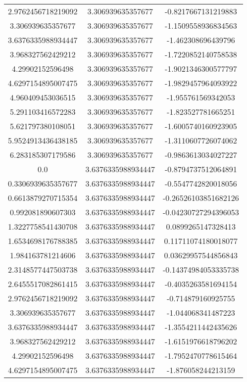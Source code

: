 \begin{table}
\begin{tabular}{ccc}
2.9762456718219092 & 3.306939635357677 & -0.8217667131219883 \\
3.306939635357677 & 3.306939635357677 & -1.1509558936834563 \\
3.6376335988934447 & 3.306939635357677 & -1.462308696439796 \\
3.968327562429212 & 3.306939635357677 & -1.7220852140758538 \\
4.29902152596498 & 3.306939635357677 & -1.9021346300577797 \\
4.6297154895007475 & 3.306939635357677 & -1.9829457964093922 \\
4.960409453036515 & 3.306939635357677 & -1.955761569342053 \\
5.291103416572283 & 3.306939635357677 & -1.823527781665251 \\
5.621797380108051 & 3.306939635357677 & -1.6005740160923905 \\
5.9524913436438185 & 3.306939635357677 & -1.3110607726074062 \\
6.283185307179586 & 3.306939635357677 & -0.9863613034027227 \\
0.0 & 3.6376335988934447 & -0.8794737512064891 \\
0.3306939635357677 & 3.6376335988934447 & -0.5547742820018056 \\
0.6613879270715354 & 3.6376335988934447 & -0.26526103851682126 \\
0.992081890607303 & 3.6376335988934447 & -0.04230727294396053 \\
1.3227758541430708 & 3.6376335988934447 & 0.0899265147328413 \\
1.6534698176788385 & 3.6376335988934447 & 0.11711074180018077 \\
1.984163781214606 & 3.6376335988934447 & 0.03629957544856843 \\
2.3148577447503738 & 3.6376335988934447 & -0.14374984053335738 \\
2.6455517082861415 & 3.6376335988934447 & -0.4035263581694154 \\
2.9762456718219092 & 3.6376335988934447 & -0.714879160925755 \\
3.306939635357677 & 3.6376335988934447 & -1.044068341487223 \\
3.6376335988934447 & 3.6376335988934447 & -1.3554211442435626 \\
3.968327562429212 & 3.6376335988934447 & -1.6151976618796202 \\
4.29902152596498 & 3.6376335988934447 & -1.7952470778615464 \\
4.6297154895007475 & 3.6376335988934447 & -1.876058244213159 \\

\end{tabular}
\end{table}
